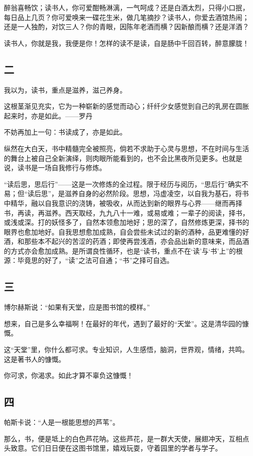 \documentclass[openany,scheme = chinese, linespread = 1.5]{ctexbook}
\begin{document}
醉翁喜畅饮；读书人，你可爱酣畅淋漓，一气呵成？还是白酒太烈，只得小口抿，每日品上几页？你可爱唤来一碟花生米，做几笔摘抄？读书人，你爱去酒馆热闹；还是一人独酌，对饮三人？你的青眼，因陈年老酒而横？因新酿而横？还是洋酒？

读书人，你就是我，我便是你！怎样的读不是读，自是肠中千回百转，醉意朦胧！
\subsection*{二}
我以为，读书，重点是滋养，滋己养身。

这根茎渐见充实，它为一种崭新的感觉而动心；纤纤少女感觉到自己的乳房在圆胀起来时，亦是如此。——罗丹

不妨再加上一句：书读成了，亦是如此。

纵然在大白天，书中精髓完全被照亮，倘若不求助于心灵与思想，不在时间与生活的舞台上被自己全新演绎，则肉眼所能看到的，也不会比黑夜所见更多。也就是说，读书是一场自我修行与修炼。

“读后思，思后行”——这是一次修炼的全过程。限于经历与阅历，“思后行”确实不易；但“读后思”，是滋养自身的必然阶段。思想，冯虚凌空，以自我为基石，将书中精华，融以自我意识的浇铸，被吸收，从而达到新的眼界与心界——继而再择书，再读，再滋养。西天取经，九九八十一难，或易或难；一辈子的阅读，择书，或浅或深。打的妖怪多了，自然本领愈加地好；思的深了，自然修炼更深，择书的眼界也愈加地好。自我思想愈加成熟，自会尝些未试过的新的酒种，品更难懂的好酒，和那些本不起兴的苦涩的药酒；即使再尝浅酒，亦会品出新的意味来，而品酒的方式亦会愈加成熟。是所谓良性循环，也是“读书，重点不在‘读’与‘书’上”的根源：毕竟思的好了，“读”之法可自通；“书”之择可自选。

\subsection*{三}
    博尔赫斯说：“如果有天堂，应是图书馆的模样。”
    
    想来，自己是多么幸福啊！在最好的年代，遇到了最好的“天堂”。这是清华园的慷慨。
    
    这“天堂”里，你什么都可求。专业知识，人生感悟，脑洞，世界观，情绪，共鸣。这是著书人的慷慨。
    
    你可求，你渴求。如此才算不辜负这慷慨！
    
\subsection*{四}
    帕斯卡说：“人是一根能思想的芦苇”。
    
    那么，书，便是坻上的白色芦花呐。这些芦花，是一群大天使，展翅冲天，互相点头致意。它们日日便在这图书馆里，嬉戏玩耍，守着园里的学者与学子。
\end{document}
